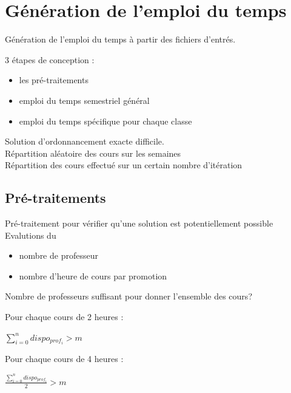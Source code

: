 \documentclass{beamer}
\begin{document}
\section{Génération de l'emploi du temps}
\begin {frame}
Génération de l'emploi du temps à partir des fichiers d'entrés.

3 étapes de conception : 
\begin{itemize}
\item les pré-traitements
\item emploi du temps semestriel général
\item emploi du temps spécifique pour chaque classe
\end{itemize}
\end{frame}

\begin{frame}
Solution d'ordonnancement exacte difficile.\\
\vspace{\baselineskip}
Répartition aléatoire des cours sur les semaines\\
\vspace{\baselineskip}
Répartition des cours effectué sur un certain nombre d'itération
\end{frame}

\subsection{Pré-traitements}
\begin{frame}
Pré-traitement pour vérifier qu'une solution est potentiellement possible\\
\vspace{\baselineskip}
Evalutions du
\begin {itemize}
\item nombre de professeur
\item nombre d'heure de cours par promotion
\end{itemize}
\end{frame}

\begin{frame}
Nombre de professeurs suffisant pour donner l'ensemble des cours?
\end{frame}

\begin{frame}
Pour chaque cours de 2 heures : 
\begin{center}
$\sum_{i=0}^n dispo_{prof_i} > m$\\
\end{center}
\vspace{\baselineskip}
Pour chaque cours de 4 heures : \\
\begin{center}
$\frac{\sum_{i=0}^n dispo_{prof_i}}{2} > m$
\end{center}
\end{frame}
\end{document}
